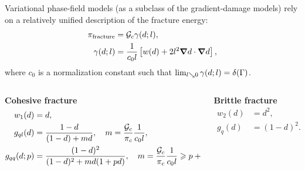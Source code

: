 \begin{frame}{}
Variational phase-field models (as a subclass of the gradient-damage models) rely on a relatively unified description of the fracture energy:
\begin{align}
    \pi_{\text{fracture}} &= {\mathcal{G}_c} \gamma(d; l), \\
    \gamma(d; l) &= \dfrac{1}{c_0 l} \left[ w(d) + 2l^2 \boldsymbol{\nabla} d \cdot \boldsymbol{\nabla} d \right],
\end{align}
where $c_0$ is a normalization constant such that $\lim_{l \searrow 0} \gamma(d; l) = \delta(\Gamma)$. \\
\bigskip
\begin{columns}
    \begin{column}{0.5\textwidth}
        \begin{block}{\textbf{Cohesive fracture}}
        \vspace{-1em}
        \begin{align*}
            w_1(d) &= d, \\
            g_{ql}(d) &= \dfrac{1 - d}{(1 - d) + m d}, \quad m = \dfrac{{\mathcal{G}_c}}{\pi_c} \dfrac{1}{c_0 l}, \\
            g_{qq}(d; p) &= \dfrac{(1 - d)^2}{(1 - d)^2 + m d (1 + p d)}, \quad m = \dfrac{{\mathcal{G}_c}}{\pi_c} \dfrac{1}{c_0 l} \geqslant p + 2.
        \end{align*}
        \end{block}
    \end{column}
    \begin{column}{0.5\textwidth}
        \begin{block}{\textbf{Brittle fracture}}
        \vspace{-1em}
        \begin{align*}
            w_2(d) &= d^2, \\
            g_q(d) &= (1 - d)^2.
        \end{align*}
        \end{block}
    \end{column}
\end{columns}
\end{frame}
